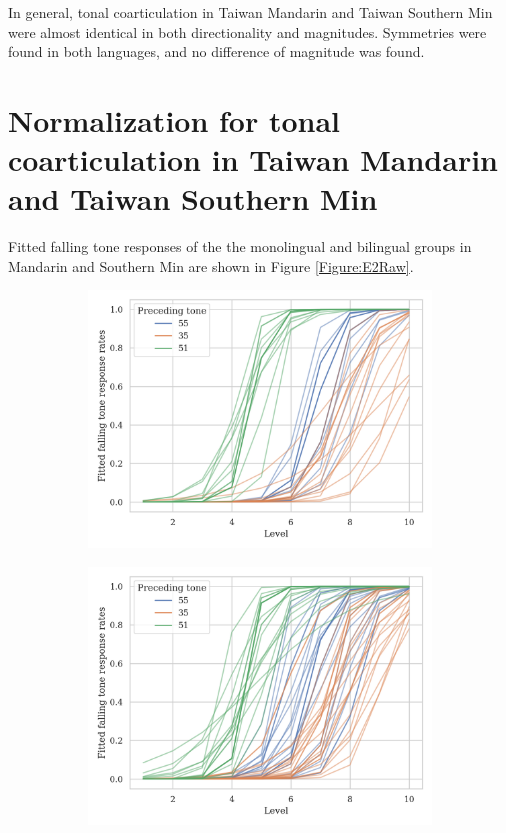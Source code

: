 \documentclass[12pt]{report}
\begin{document}
\begin{CJK}{UTF8}{bsmi}
In general, tonal coarticulation in Taiwan Mandarin and Taiwan Southern Min were almost identical in both directionality and magnitudes. Symmetries were found in both languages, and no difference of magnitude was found.

\section{Normalization for tonal coarticulation in Taiwan Mandarin and Taiwan Southern Min}
Fitted falling tone responses of the the monolingual and bilingual groups in Mandarin and Southern Min are shown in Figure \ref{Figure:E2Raw}.

\begin{figure}[hbt!]
\centering
\begin{subfigure}[b]{.45\textwidth}
\centering
\includegraphics[width=\textwidth]{Figures/E2/Mandarin_monolingual_E2_raw.png}
\end{subfigure}
\hfill
\begin{subfigure}[b]{.45\textwidth}
\centering
\includegraphics[width=\textwidth]{Figures/E2/Mandarin_bilingual_E2_raw.png}

\end{subfigure}
\end{figure}
\end{CJK}
\end{document}
